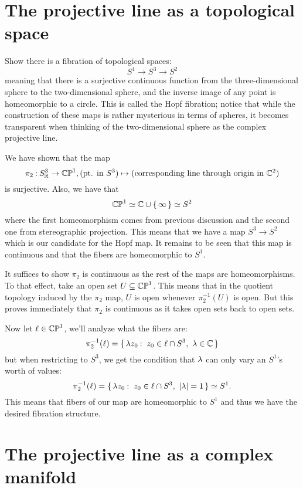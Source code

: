 \documentclass[12pt]{memoir}
\begin{document}
\section{The projective line as a topological space}

\begin{Ej}
    Show there is a fibration of topological spaces:
    $$S^1\to S^3\to S^2$$
    meaning that there is a surjective continuous function from the three-dimensional sphere to the two-dimensional sphere, and the inverse image of any point is homeomorphic to a circle. This is called the Hopf fibration; notice that while the construction of these maps is rather mysterious in terms of spheres, it becomes transparent when thinking of the two-dimensional sphere as the complex projective line.
\end{Ej}
\begin{ptcbr}
We have shown that the map 
$$\pi_2\mathbin{:} S^3_{\mathbb{R}}\to\mathbb{CP}^1,(\text{pt. in }S^3)\mapsto(\text{corresponding line through origin in }\mathbb{C}^2)$$
is surjective. Also, we have that 
$$\mathbb{CP}^1\simeq \mathbb{C}\cup\{\,\infty\,\}\simeq S^2$$
where the first homeomorphism comes from previous discussion and the second one from stereographic projection. This means that we have a map $S^3\to S^2$ which is our candidate for the Hopf map. It remains to be seen that this map is continuous and that the fibers are homeomorphic to $S^1$.\par 
It suffices to show $\pi_2$ is continuous as the rest of the maps are homeomorphisms. To that effect, take an open set $U\subseteq\mathbb{CP}^1$. This means that in the quotient topology induced by the $\pi_2$ map, $U$ is open whenever $\pi_2^{-1}(U)$ is open. But this proves immediately that $\pi_2$ is continuous as it takes open sets back to open sets.\par 
Now let $\ell\in\mathbb{CP}^1$, we'll analyze what the fibers are:
$$\pi_2^{-1}(\l)=\set{\la z_0\:\ z_0\in\l\cap S^3,\ \la\in\bC}$$
but when restricting to $S^3$, we get the condition that $\lambda$ can only vary an $S^1$'s worth of values:
$$\pi_2^{-1}(\ell)=\{\,\lambda z_0\mathbin{:}\ z_0\in\ell\cap S^3,\ |\lambda|=1\,\}\simeq S^1.$$
This means that fibers of our map are homeomorphic to $S^1$ and thus we have the desired fibration structure.
\end{ptcbr}
\newpage
\section{The projective line as a complex manifold}
\end{document}
